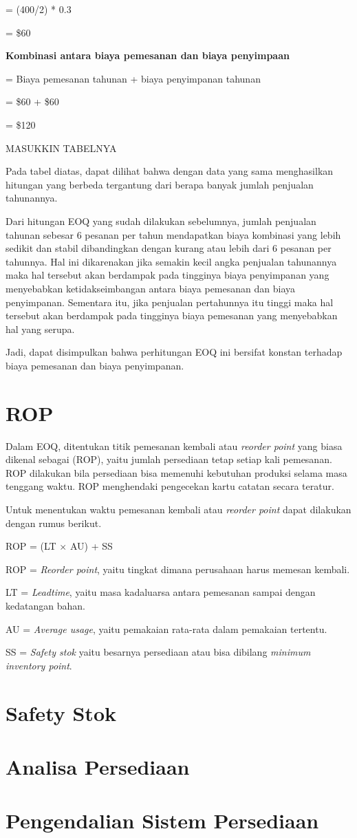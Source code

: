 = (400/2) * 0.3

= \${60}

\textbf{Kombinasi antara biaya pemesanan dan biaya penyimpaan}

= Biaya pemesanan tahunan + biaya penyimpanan tahunan

= \${60} + \${60}

= \${120}

MASUKKIN TABELNYA

Pada tabel diatas, dapat dilihat bahwa dengan data yang sama menghasilkan hitungan yang berbeda tergantung dari berapa banyak jumlah penjualan tahunannya.

Dari hitungan EOQ yang sudah dilakukan sebelumnya, jumlah penjualan tahunan sebesar 6 pesanan per tahun mendapatkan biaya kombinasi yang lebih sedikit dan stabil dibandingkan dengan kurang atau lebih dari 6 pesanan per tahunnya. Hal ini dikarenakan jika semakin kecil angka penjualan tahunannya maka hal tersebut akan berdampak pada tingginya biaya penyimpanan yang menyebabkan ketidakseimbangan antara biaya pemesanan dan biaya penyimpanan. Sementara itu, jika penjualan pertahunnya itu tinggi maka hal tersebut akan berdampak pada tingginya biaya pemesanan yang menyebabkan hal yang serupa.

Jadi, dapat disimpulkan bahwa perhitungan EOQ ini bersifat konstan terhadap biaya pemesanan dan biaya penyimpanan.

\section{ROP}

Dalam EOQ, ditentukan titik pemesanan kembali atau \textit{reorder point} yang biasa dikenal sebagai (ROP), yaitu jumlah persediaan tetap setiap kali pemesanan. ROP dilakukan bila persediaan bisa memenuhi kebutuhan produksi selama masa tenggang waktu. ROP menghendaki pengecekan kartu catatan secara teratur.

Untuk menentukan waktu pemesanan kembali atau \textit{reorder point} dapat dilakukan dengan rumus berikut.

ROP = (LT $\times$ AU) + SS

ROP = \textit{Reorder point}, yaitu tingkat dimana perusahaan harus memesan kembali.

LT = \textit{Leadtime}, yaitu masa kadaluarsa antara pemesanan sampai dengan kedatangan bahan.

AU = \textit{Average usage}, yaitu pemakaian rata-rata dalam pemakaian tertentu.

SS = \textit{Safety stok} yaitu besarnya persediaan atau bisa dibilang \textit{minimum inventory point}.

\section{Safety Stok}
\section{Analisa Persediaan}
\section{Pengendalian Sistem Persediaan}


